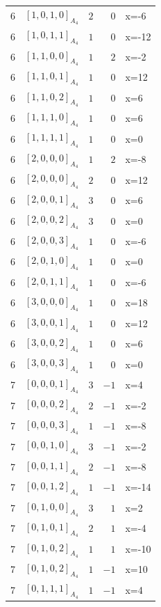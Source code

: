 \documentclass[11pt]{article}
\newcommand{\Dynkin}[1]{#1}
\begin{document}
\begin{longtable}{r l r r l}
6 & $\Dynkin{[1,0,1,0]_{A_4}}$ & $2$ & $0$ & x=-6\\
6 & $\Dynkin{[1,0,1,1]_{A_4}}$ & $1$ & $0$ & x=-12\\
6 & $\Dynkin{[1,1,0,0]_{A_4}}$ & $1$ & $2$ & x=-2\\
6 & $\Dynkin{[1,1,0,1]_{A_4}}$ & $1$ & $0$ & x=12\\
6 & $\Dynkin{[1,1,0,2]_{A_4}}$ & $1$ & $0$ & x=6\\
6 & $\Dynkin{[1,1,1,0]_{A_4}}$ & $1$ & $0$ & x=6\\
6 & $\Dynkin{[1,1,1,1]_{A_4}}$ & $1$ & $0$ & x=0\\
6 & $\Dynkin{[2,0,0,0]_{A_4}}$ & $1$ & $2$ & x=-8\\
6 & $\Dynkin{[2,0,0,0]_{A_4}}$ & $2$ & $0$ & x=12\\
6 & $\Dynkin{[2,0,0,1]_{A_4}}$ & $3$ & $0$ & x=6\\
6 & $\Dynkin{[2,0,0,2]_{A_4}}$ & $3$ & $0$ & x=0\\
6 & $\Dynkin{[2,0,0,3]_{A_4}}$ & $1$ & $0$ & x=-6\\
6 & $\Dynkin{[2,0,1,0]_{A_4}}$ & $1$ & $0$ & x=0\\
6 & $\Dynkin{[2,0,1,1]_{A_4}}$ & $1$ & $0$ & x=-6\\
6 & $\Dynkin{[3,0,0,0]_{A_4}}$ & $1$ & $0$ & x=18\\
6 & $\Dynkin{[3,0,0,1]_{A_4}}$ & $1$ & $0$ & x=12\\
6 & $\Dynkin{[3,0,0,2]_{A_4}}$ & $1$ & $0$ & x=6\\
6 & $\Dynkin{[3,0,0,3]_{A_4}}$ & $1$ & $0$ & x=0\\
7 & $\Dynkin{[0,0,0,1]_{A_4}}$ & $3$ & $-1$ & x=4\\
7 & $\Dynkin{[0,0,0,2]_{A_4}}$ & $2$ & $-1$ & x=-2\\
7 & $\Dynkin{[0,0,0,3]_{A_4}}$ & $1$ & $-1$ & x=-8\\
7 & $\Dynkin{[0,0,1,0]_{A_4}}$ & $3$ & $-1$ & x=-2\\
7 & $\Dynkin{[0,0,1,1]_{A_4}}$ & $2$ & $-1$ & x=-8\\
7 & $\Dynkin{[0,0,1,2]_{A_4}}$ & $1$ & $-1$ & x=-14\\
7 & $\Dynkin{[0,1,0,0]_{A_4}}$ & $3$ & $1$ & x=2\\
7 & $\Dynkin{[0,1,0,1]_{A_4}}$ & $2$ & $1$ & x=-4\\
7 & $\Dynkin{[0,1,0,2]_{A_4}}$ & $1$ & $1$ & x=-10\\
7 & $\Dynkin{[0,1,0,2]_{A_4}}$ & $1$ & $-1$ & x=10\\
7 & $\Dynkin{[0,1,1,1]_{A_4}}$ & $1$ & $-1$ & x=4\\

\end{longtable}
\end{document}
